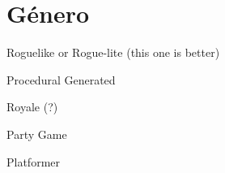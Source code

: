 \chapter{Género}

Roguelike or Rogue-lite (this one is better)

Procedural Generated

Royale (?)

Party Game

Platformer